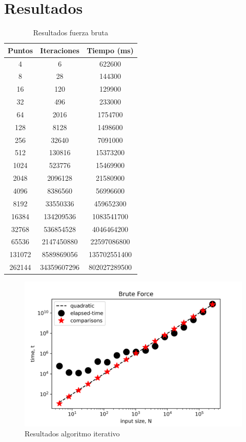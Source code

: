 \section{Resultados}
\begin{table}[h!]
    \centering
    \begin{tabular}{|c|c|c|}
    \hline
    Puntos & Iteraciones & Tiempo (ms)\\
    \hline
    4 & 6 & 622600\\
    \hline
    8 & 28 & 144300\\
    \hline
    16 &120 & 129900\\
    \hline
    32 &496 & 233000\\
    \hline
    64 & 2016 & 1754700\\
    \hline
    128 & 8128 & 1498600\\
    \hline
    256 & 32640 & 7091000\\
    \hline
    512 & 130816 & 15373200\\
    \hline
    1024 & 523776 & 15469900\\
    \hline
    2048 & 2096128 & 21580900\\
    \hline
    4096 & 8386560 & 56996600\\
    \hline
    8192 & 33550336 & 459652300\\
    \hline
    16384 & 134209536 & 1083541700\\
    \hline
   32768 & 536854528 & 4046464200\\
    \hline
    65536 & 2147450880 & 22597086800\\
    \hline
    131072 & 8589869056 & 135702551400\\
    \hline
    262144 & 34359607296 & 802027289500\\
    \hline
    \end{tabular}
    \caption{Resultados fuerza bruta}
    \label{tab:bruteT}
\end{table}
\begin{figure}[h!]
    \centering
    \includegraphics[scale=0.8, center]{images/brute.png}
    \caption{ Resultados algoritmo iterativo}
    \label{iterG}
\end{figure}
